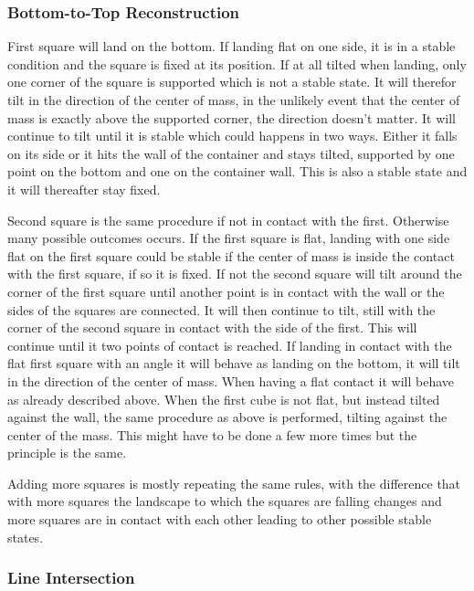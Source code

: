 \documentclass[12pt, sumlimits, intlimits]{article}
\begin{document}
\subsubsection{Bottom-to-Top Reconstruction}
First square will land on the bottom. If landing flat on one side, it is in a stable condition and the square is fixed at its position. If at all tilted when landing, only one corner of the square is supported which is not a stable state. It will therefor tilt in the direction of the center of mass, in the unlikely event that the center of mass is exactly above the supported corner, the direction doesn't matter. It will continue to tilt until it is stable which could happens in two ways. Either it falls on its side or it hits the wall of the container and stays tilted, supported by one point on the bottom and one on the container wall. This is also a stable state and it will thereafter stay fixed.

Second square is the same procedure if not in contact with the first. Otherwise many possible outcomes occurs. If the first square is flat, landing with one side flat on the first square could be stable if the center of mass is inside the contact with the first square, if so it is fixed. If not the second square will tilt around the corner of the first square until another point is in contact with the wall or the sides of the squares are connected. It will then continue to tilt, still with the corner of the second square in contact with the side of the first. This will continue until it two points of contact is reached.
If landing in contact with the flat first square with an angle it will behave as landing on the bottom, it will tilt in the direction of the center of mass. When having a flat contact it will behave as already described above.
When the first cube is not flat, but instead tilted against the wall, the same procedure as above is performed, tilting against the center of the mass. This might have to be done a few more times but the principle is the same.

Adding more squares is mostly repeating the same rules, with the difference that with more squares the landscape to which the squares are falling changes and more squares are in contact with each other leading to other possible stable states.




\subsubsection{Line Intersection}
\end{document}
